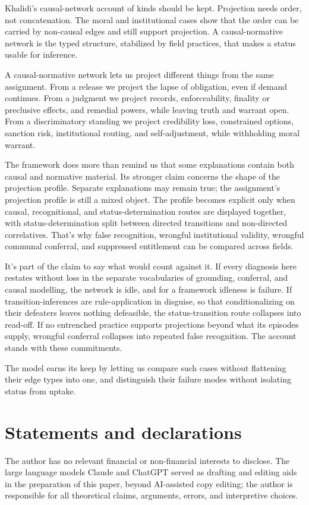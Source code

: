 \documentclass[12pt]{article}
\begin{document}
Khalidi's causal-network account of kinds should be kept. Projection needs order, not concatenation. The moral and institutional cases show that the order can be carried by non-causal edges and still support projection. A causal-normative network is the typed structure, stabilized by field practices, that makes a status usable for inference.

A causal-normative network lets us project different things from the same assignment. From a release we project the lapse of obligation, even if demand continues. From a judgment we project records, enforceability, finality or preclusive effects, and remedial powers, while leaving truth and warrant open. From a discriminatory standing we project credibility loss, constrained options, sanction risk, institutional routing, and self-adjustment, while withholding moral warrant.

The framework does more than remind us that some explanations contain both causal and normative material. Its stronger claim concerns the shape of the projection profile. Separate explanations may remain true; the assignment's projection profile is still a mixed object. The profile becomes explicit only when causal, recognitional, and status-determination routes are displayed together, with status-determination split between directed transitions and non-directed correlatives. That's why false recognition, wrongful institutional validity, wrongful communal conferral, and suppressed entitlement can be compared across fields.

It's part of the claim to say what would count against it. If every diagnosis here restates without loss in the separate vocabularies of grounding, conferral, and causal modelling, the network is idle, and for a framework idleness is failure. If transition-inferences are rule-application in disguise, so that conditionalizing on their defeaters leaves nothing defeasible, the status-transition route collapses into read-off. If no entrenched practice supports projections beyond what its episodes supply, wrongful conferral collapses into repeated false recognition. The account stands with these commitments.

The model earns its keep by letting us compare such cases without flattening their edge types into one, and distinguish their failure modes without isolating status from uptake.

\section*{Statements and declarations}

The author has no relevant financial or non-financial interests to disclose. The large language models Claude and ChatGPT served as drafting and editing aids in the preparation of this paper, beyond AI-assisted copy editing; the author is responsible for all theoretical claims, arguments, errors, and interpretive choices.

\newpage
\printbibliography
\end{document}
